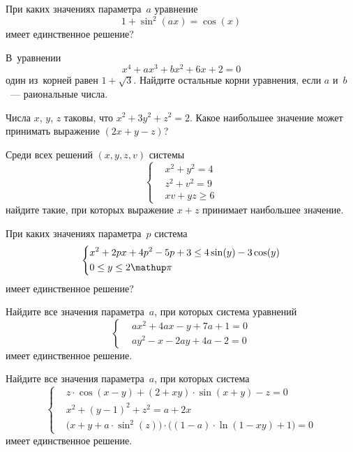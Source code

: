 \begin{problems}

\item
При каких значениях параметра~$a$ уравнение
\[
    1 + \sin^2 (a x) = \cos(x)
\]
имеет единственное решение?

\item
В~уравнении
\[
    x^4 + a x^3 + b x^2 + 6 x + 2 = 0
\]
один из~корней равен $1 + \sqrt{3}$.
Найдите остальные корни уравнения, если $a$ и~$b$~--- раиональные числа.

\item
Числа $x$, $y$, $z$ таковы, что $x^2 + 3 y^2 + z^2 = 2$.
Какое наибольшее значение может принимать выражение $(2 x + y - z)$?

\item
Среди всех решений $(x, y, z, v)$ системы
\[ \left\{ \begin{aligned} &
    x^2 + y^2 = 4
\\ &
    z^2 + v^2 = 9
\\ &
    x v + y z \geq 6
\end{aligned} \right. \]
найдите такие, при которых выражение $x + z$ принимает наибольшее значение.

\item
При каких значениях параметра~$p$ система
\[ \left\{ \begin{aligned} &
    x^2 + 2 p x + 4 p^2 - 5 p + 3
    \leq
    4 \sin(y) - 3 \cos(y)
\\ &
    0 \leq y \leq 2 \piconst
\end{aligned} \right. \]
имеет единственное решение?

\item
Найдите все значения параметра~$a$, при которых система уравнений
\[ \left\{ \begin{aligned} &
    a x^2 + 4 a x - y + 7 a + 1 = 0
\\ &
    a y^2 - x - 2 a y + 4 a - 2 = 0
\end{aligned} \right. \]
имеет единственное решение.

\item
Найдите все значения параметра~$a$, при которых система
\[ \left\{ \begin{aligned} &
    z \cdot \cos(x - y) + (2 + x y) \cdot \sin(x + y) - z = 0
\\ &
    x^2 + (y - 1)^2 + z^2 = a + 2 x
\\ &
    \bigl(
        x + y + a \cdot \sin^2 (z)
    \bigr)
    \cdot
    \bigl(
        (1 - a) \cdot \ln(1 - x y) + 1
    \bigr)
    = 0
\end{aligned} \right. \]
имеет единственное решение.


\end{problems}
